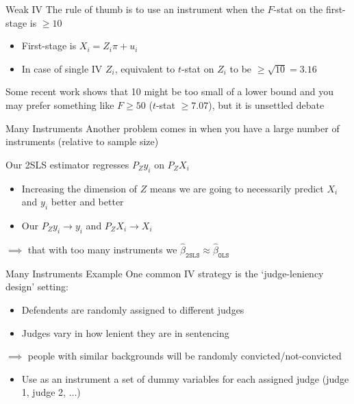 \documentclass[aspectratio=169,t,11pt,table]{beamer}
\begin{document}
\begin{frame}{Weak IV}
  The rule of thumb is to use an instrument when the $F$-stat on the first-stage is $\geq 10$
  \begin{itemize}
    \item First-stage is $X_i = Z_i \pi + u_i$ 
    
    \item In case of single IV $Z_i$, equivalent to $t$-stat on $Z_i$ to be $\geq \sqrt{10} = 3.16$
  \end{itemize}

  \pause
  \bigskip
  Some recent work shows that 10 might be too small of a lower bound and you may prefer something like $F \geq 50$ ($t$-stat $\geq 7.07$), but it is unsettled debate
\end{frame}

\begin{frame}{Many Instruments}
  Another problem comes in when you have a large number of instruments (relative to sample size)

  \bigskip
  Our 2SLS estimator regresses $P_Z y_i$ on $P_Z X_i$
  \begin{itemize}
    \item Increasing the dimension of $Z$ means we are going to necessarily predict $X_i$ and $y_i$ better and better
    
    \item Our $P_Z y_i \to y_i$ and $P_Z X_i \to X_i$
  \end{itemize}

  \bigskip
  \pause
  $\implies$ that with too many instruments we $\hat{\beta}_{\texttt{2SLS}} \approx \hat{\beta}_{\texttt{OLS}}$
\end{frame}

\begin{frame}{Many Instruments Example}
  One common IV strategy is the `judge-leniency design' setting:
  \begin{itemize}
    \item Defendents are randomly assigned to different judges
    \item Judges vary in how lenient they are in sentencing
  \end{itemize}

  
  \bigskip
  $\implies$ people with similar backgrounds will be randomly convicted/not-convicted
  \begin{itemize}
    \item Use as an instrument a set of dummy variables for each assigned judge (judge 1, judge 2, $\dots$)
  \end{itemize}
\end{frame}
\end{document}
